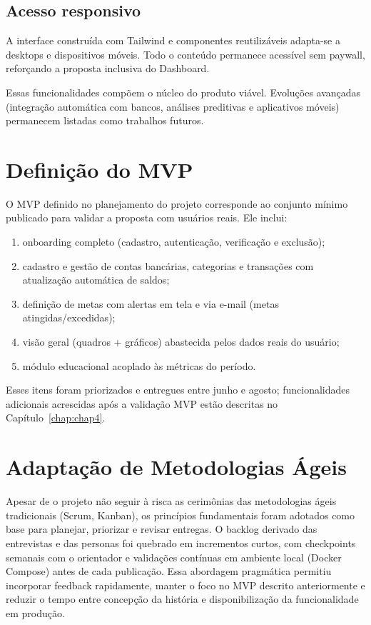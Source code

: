 \subsection{Acesso responsivo}
A interface construída com Tailwind e componentes reutilizáveis adapta-se a desktops e dispositivos móveis. Todo o conteúdo permanece acessível sem paywall, reforçando a proposta inclusiva do Dashboard.

Essas funcionalidades compõem o núcleo do produto viável. Evoluções avançadas (integração automática com bancos, análises preditivas e aplicativos móveis) permanecem listadas como trabalhos futuros.

\section{Definição do MVP}

O MVP definido no planejamento do projeto corresponde ao conjunto mínimo publicado para validar a proposta com usuários reais. Ele inclui:
\begin{enumerate}
    \item onboarding completo (cadastro, autenticação, verificação e exclusão);
    \item cadastro e gestão de contas bancárias, categorias e transações com atualização automática de saldos;
    \item definição de metas com alertas em tela e via e-mail (metas atingidas/excedidas);
    \item visão geral (quadros + gráficos) abastecida pelos dados reais do usuário;
    \item módulo educacional acoplado às métricas do período.
\end{enumerate}
Esses itens foram priorizados e entregues entre junho e agosto; funcionalidades adicionais acrescidas após a validação MVP estão descritas no Capítulo~\ref{chap:chap4}.

\section{Adaptação de Metodologias Ágeis}

Apesar de o projeto não seguir à risca as cerimônias das metodologias ágeis tradicionais (Scrum, Kanban), os princípios fundamentais foram adotados como base para planejar, priorizar e revisar entregas. O backlog derivado das entrevistas e das personas foi quebrado em incrementos curtos, com checkpoints semanais com o orientador e validações contínuas em ambiente local (Docker Compose) antes de cada publicação. Essa abordagem pragmática permitiu incorporar feedback rapidamente, manter o foco no MVP descrito anteriormente e reduzir o tempo entre concepção da história e disponibilização da funcionalidade em produção.

